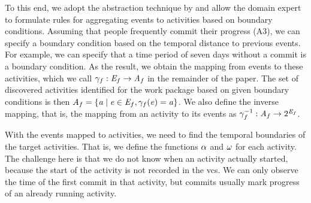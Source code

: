To this end, we adopt the abstraction technique by \cite{baier2014bridging} and allow the domain expert to formulate rules for aggregating events to activities based on boundary conditions. Assuming that people frequently commit their progress (A3), we can specify a boundary condition based on the temporal distance to previous events. For example, we can specify that a time period of seven days without a commit is a boundary condition. %
As the result, we obtain the mapping from events to these activities, which we call $\gamma_{f} : \mathit{E}_{f} \rightarrow \mathit{A}_{f}$ in the remainder of the paper. The set of discovered activities identified for the work package based on given boundary conditions is then $\mathit{A}_{f} = \lbrace \mathit{a} \mid \mathit{e} \in \mathit{E}_{f}, \gamma_{f}(\mathit{e}) = \mathit{a} \rbrace$. We also define the inverse mapping, that is, the mapping from an activity to its events as $\gamma_{f}^{-1} : \mathit{A}_{f} \rightarrow 2^{\mathit{E}_{f}}$.

With the events mapped to activities, we need to find the temporal boundaries of the target activities. That is, we define the functions $\alpha$ and $\omega$ for each activity. The challenge here is that we do not know when an activity actually started, because the start of the activity is not recorded in the \gls{vcs}. We can only observe the time of the first commit in that activity, but commits usually mark progress of an already running activity.

